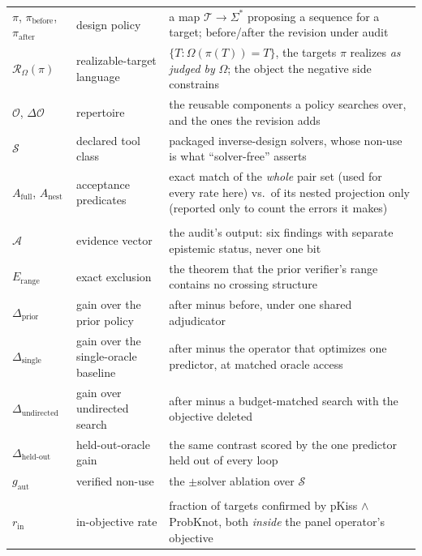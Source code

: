 \documentclass[11pt]{article}
\newcommand{\Rze}[2]{\ensuremath{\mathcal{R}_{#1}(#2)}}
\begin{document}
\begin{xltabular}{\linewidth}{@{}>{\raggedright\arraybackslash}p{2.35cm}>{\raggedright\arraybackslash}p{3.3cm}L@{}}
$\pi$, $\pi_{\mathrm{before}}$, $\pi_{\mathrm{after}}$ & design policy & a map $\mathcal T\!\to\Sigma^\ast$ proposing a sequence for a target; before/after the revision under audit\\
$\Rze{\Omega}{\pi}$ & realizable-target language & $\{T:\Omega(\pi(T))=T\}$, the targets $\pi$ realizes \emph{as judged by} $\Omega$; the object the negative side constrains\\
$\mathcal O$, $\Delta\mathcal O$ & repertoire & the reusable components a policy searches over, and the ones the revision adds\\
$\mathcal S$ & declared tool class & packaged inverse-design solvers, whose non-use is what ``solver-free'' asserts\\
$A_{\mathrm{full}}$, $A_{\mathrm{nest}}$ & acceptance predicates & exact match of the \emph{whole} pair set (used for every rate here) vs.\ of its nested projection only (reported only to count the errors it makes)\\
\addlinespace[3pt]
\\
\addlinespace[2pt]
$\mathcal A$ & evidence vector & the audit's output: six findings with separate epistemic status, never one bit\\
$E_{\mathrm{range}}$ & exact exclusion & the theorem that the prior verifier's range contains no crossing structure\\
$\Delta_{\mathrm{prior}}$ & gain over the prior policy & after minus before, under one shared adjudicator\\
$\Delta_{\mathrm{single}}$ & gain over the single-oracle baseline & after minus the operator that optimizes one predictor, at matched oracle access\\
$\Delta_{\mathrm{undirected}}$ & gain over undirected search & after minus a budget-matched search with the objective deleted\\
$\Delta_{\mathrm{held\text{-}out}}$ & held-out-oracle gain & the same contrast scored by the one predictor held out of every loop\\
$g_{\mathrm{aut}}$ & verified non-use & the $\pm$solver ablation over $\mathcal S$\\
\addlinespace[3pt]
\\
\addlinespace[2pt]
$r_{\mathrm{in}}$ & in-objective rate & fraction of targets confirmed by pKiss $\wedge$ ProbKnot, both \emph{inside} the panel operator's objective\\

\end{xltabular}
\end{document}
